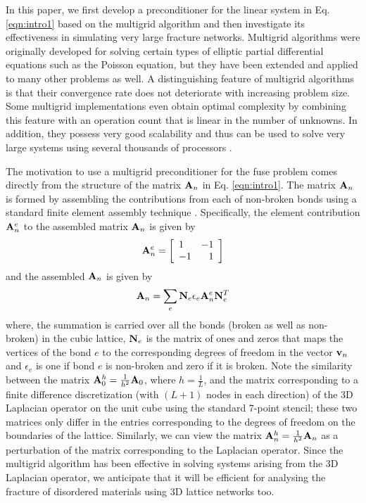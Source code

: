 \documentclass[11pt]{iopart}
\begin{document}
In this paper, we first develop a preconditioner for the linear 
system in Eq. \ref{eqn:intro1} based on the multigrid 
algorithm \cite{briggs00, trottenberg-oosterlee-schuller02} and then 
investigate its effectiveness in simulating very large 
 fracture networks. Multigrid algorithms were originally developed for solving certain types of elliptic 
 partial differential equations such as the Poisson equation, but they have been extended and applied to 
 many other problems as well. A distinguishing feature of multigrid algorithms is that their convergence rate does
not deteriorate with increasing problem size. Some multigrid implementations even obtain optimal complexity by
combining this feature with an operation count that is linear in the number of unknowns. 
In addition, they possess very good scalability and thus 
can be used to solve very large systems using several thousands of processors \cite{Adams-04b, adams99, 
boomeramg00, dendro, mgcg94, gradl-rude08, bergen-gradl-hulsemann-rude06, bergen-hulsemann-rude05}. 

The motivation to use a multigrid preconditioner for the fuse problem comes directly from the 
structure of the matrix ${\bf A}_n$ in Eq. \ref{eqn:intro1}. The matrix ${\bf A}_n$ is formed by
assembling the contributions from each of non-broken bonds using a standard finite
element assembly technique \cite{tjr}. Specifically, the element contribution ${\bf A}_n^e$ to the 
assembled matrix ${\bf A}_n$ is given by 
\begin{equation}
\label{eqn:intro2}
{\bf A}_n^e  = \left [ 
\begin{array}{lr}
1 & -1 \\
-1 & 1
\end{array} \right ]
\end{equation}
and the assembled ${\bf A}_n$ is given by
\begin{equation}
\label{eqn:intro3}
{\bf A}_n = \displaystyle\sum_{e} {\bf N}_e \epsilon_e {\bf A}_n^e {\bf N}_e^T
\end{equation}
where, the summation is carried over all the bonds (broken as well as non-broken) in the cubic lattice, 
${\bf N}_e$ is the matrix of ones and zeros that maps the vertices of the bond $e$ to the corresponding
degrees of freedom in the vector ${\bf v}_n$ and $\epsilon_e$ is one if bond $e$ is non-broken and zero if it is broken.
Note the similarity between the matrix ${\bf A}_0^{h} = \frac{1}{h^2} {\bf A}_0$, where $h = \frac{1}{L}$, and the matrix corresponding to a finite
 difference discretization (with $(L + 1)$ nodes in each direction) of the 3D Laplacian operator on the unit cube using the standard 7-point stencil; these two matrices only differ in the entries corresponding to the degrees of freedom on the boundaries of the lattice. Similarly, we can view 
 the matrix ${\bf A}_n^{h} = \frac{1}{h^2} {\bf A}_n$ as a perturbation of the matrix corresponding to the Laplacian operator. 
Since the multigrid algorithm has been effective in solving systems arising from the 3D Laplacian operator, we 
anticipate that it will be efficient for analysing the fracture of disordered materials using 3D lattice networks too. 
 
\end{document}
